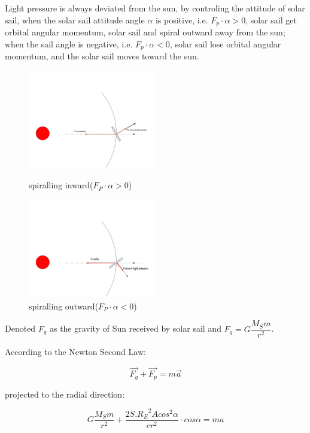 \documentclass[../Paper.tex]{subfiles}
\begin{document}
Light pressure is always deviated from the sun, by controling the attitude of solar sail, when the solar sail attitude angle $\alpha$ is positive, i.e. $F_p\cdot\alpha>0$, solar sail get orbital angular momentum, solar sail and spiral outward away from the sun; when the sail angle is negative, i.e. $F_p\cdot\alpha<0$, solar sail lose orbital angular momentum, and the solar sail moves toward the sun. 

\begin{figure}[H]
 \begin{minipage}[t]{0.5\linewidth}
 \centering{}
 \includegraphics[width=2.2in]{accelerate.pdf}
 \caption{spiralling inward($F_P\cdot\alpha>0$)}
 \label{fig:side:a}
 \end{minipage}
 \begin{minipage}[t]{0.5\linewidth}
 \centering{}
 \includegraphics[width=2.2in]{../Figures/decrease.pdf}
 \caption{spiralling outward($F_P\cdot\alpha<0$)}
 \label{fig:side:b}
 \end{minipage}
\end{figure}

Denoted $F_g$ as the gravity of Sun received by solar sail and $F_g=G\dfrac{M_Sm}{r^2}$.

According to the Newton Second Law:

\begin{equation}
\vec{F_g}+\vec{F_p}=m\vec{a}
\end{equation}

projected to the radial direction:

\begin{equation}
G\dfrac{M_Sm}{r^2}+\dfrac{2S.{R_E}^2Acos^2\alpha}{cr^2}\cdot cos\alpha=ma
\end{equation}
\end{document}
